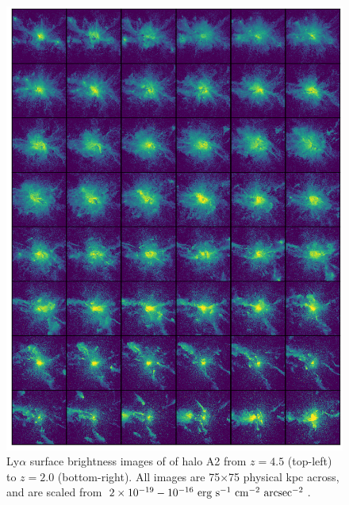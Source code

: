 \begin{figure}
    \centering
    \includegraphics[width=\textwidth,keepaspectratio]{figures/rogues_A2.png}
    \caption{
        Ly$\alpha$ surface brightness images of of halo A2 from $z=4.5$ (top-left) to $z=2.0$ (bottom-right).
        All images are 75$\times$75 physical kpc across, and are scaled from $2\times 10^{-19}-10^{-16}\ \rm{erg}\ \rm{s}^{-1}\ \rm{cm}^{-2}\ \rm{arcsec}^{-2}$.
    }
  \label{fig:rogues2}
\end{figure}

